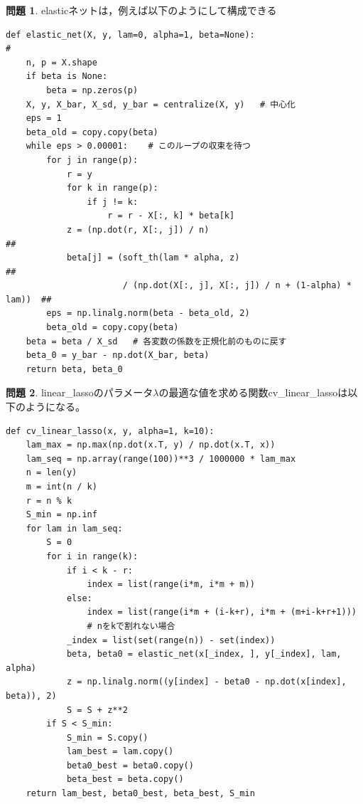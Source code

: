 \documentclass[titlepage]{jsarticle}
\theoremstyle{definition}
\newtheorem{Ex}{問題}
\theoremstyle{mystyle} %
\renewcommand{\footnotesize}{\normalsize}
\begin{document}
\begin{Ex}
elasticネットは，例えば以下のようにして構成できる
\begin{lstlisting}[basicstyle = \ttfamily\footnotesize, frame = single]
def elastic_net(X, y, lam=0, alpha=1, beta=None):                     #
    n, p = X.shape
    if beta is None:
        beta = np.zeros(p)
    X, y, X_bar, X_sd, y_bar = centralize(X, y)   # 中心化
    eps = 1
    beta_old = copy.copy(beta)
    while eps > 0.00001:    # このループの収束を待つ
        for j in range(p):
            r = y
            for k in range(p):
                if j != k:
                    r = r - X[:, k] * beta[k]
            z = (np.dot(r, X[:, j]) / n)                                    ##
            beta[j] = (soft_th(lam * alpha, z)                              ##
                       / (np.dot(X[:, j], X[:, j]) / n + (1-alpha) * lam))  ##
        eps = np.linalg.norm(beta - beta_old, 2)
        beta_old = copy.copy(beta)
    beta = beta / X_sd   # 各変数の係数を正規化前のものに戻す
    beta_0 = y_bar - np.dot(X_bar, beta)
    return beta, beta_0
\end{lstlisting}
\end{Ex}

\begin{Ex}
linear\_lassoのパラメータ$\lambda$の最適な値を求める関数cv\_linear\_lassoは以下のようになる。

\begin{lstlisting}[basicstyle = \ttfamily\footnotesize, frame = single]
def cv_linear_lasso(x, y, alpha=1, k=10):
    lam_max = np.max(np.dot(x.T, y) / np.dot(x.T, x))
    lam_seq = np.array(range(100))**3 / 1000000 * lam_max
    n = len(y)
    m = int(n / k)
    r = n % k
    S_min = np.inf
    for lam in lam_seq:
        S = 0
        for i in range(k):
            if i < k - r:
                index = list(range(i*m, i*m + m))
            else:
                index = list(range(i*m + (i-k+r), i*m + (m+i-k+r+1)))
                # nをkで割れない場合
            _index = list(set(range(n)) - set(index))
            beta, beta0 = elastic_net(x[_index, ], y[_index], lam, alpha)
            z = np.linalg.norm((y[index] - beta0 - np.dot(x[index], beta)), 2)
            S = S + z**2
        if S < S_min:
            S_min = S.copy()
            lam_best = lam.copy()
            beta0_best = beta0.copy()
            beta_best = beta.copy()
    return lam_best, beta0_best, beta_best, S_min
\end{lstlisting}
\end{Ex}
\end{document}
